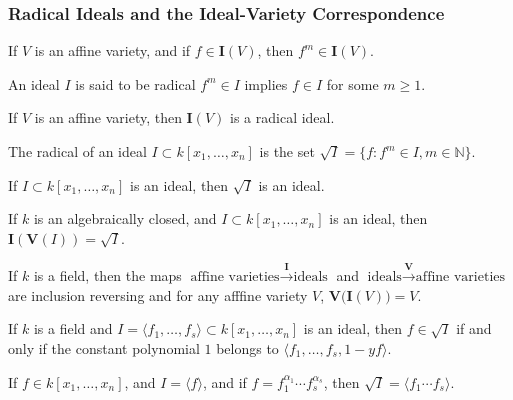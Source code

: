 \documentclass[crop=false,class=article,oneside]{standalone}
\begin{document}
    \subsubsection{Radical Ideals and the Ideal-Variety Correspondence}
    \begin{theorem}
    If $V$ is an affine variety, and if $f\in \textbf{I}(V)$, then $f^m\in \textbf{I}(V)$.
    \end{theorem}
    \begin{definition}
    An ideal $I$ is said to be radical $f^m \in I$ implies $f\in I$ for some $m\geq 1$.
    \end{definition}
    \begin{theorem}
    If $V$ is an affine variety, then $\textbf{I}(V)$ is a radical ideal.
    \end{theorem}
    \begin{definition}
    The radical of an ideal $I\subset k[x_{1},\hdots,x_{n}]$ is the set $\sqrt{I}=\{f:f^{m}\in I,m\in\mathbb{N}\}$.
    \end{definition}
    \begin{theorem}
    If $I\subset k[x_1,\hdots ,x_n]$ is an ideal, then $\sqrt{I}$ is an ideal.
    \end{theorem}
    \begin{theorem}
    If $k$ is an algebraically closed, and $I\subset k[x_1,\hdots ,x_n]$ is an ideal, then $\textbf{I}(\mathbf{V}(I))=\sqrt{I}$.
    \end{theorem}
    \begin{theorem}
    If $k$ is a field, then the maps $\textrm{affine varieties} \overset{\textbf{I}}\rightarrow \textrm{ideals}$ and $\textrm{ideals} \overset{\mathbf{V}}\rightarrow \textrm{affine varieties}$ are inclusion reversing and for any afffine variety $V$, $\mathbf{V}\big(\textbf{I}(V)\big) = V$.
    \end{theorem}
    \begin{theorem}
    If $k$ is a field and $I=\langle f_1,\hdots, f_s\rangle\subset k[x_1,\hdots ,x_n]$ is an ideal, then $f\in \sqrt{I}$ if and only if the constant polynomial $1$ belongs to $\langle f_1,\hdots, f_s, 1-yf\rangle$.
    \end{theorem}
    \begin{theorem}
    If $f\in k[x_1,\hdots ,x_n]$, and $I = \langle f\rangle$, and if $f = f_1^{\alpha_1}\cdots f_s^{\alpha_s}$, then $\sqrt{I} = \langle f_1\cdots f_s\rangle$.
    \end{theorem}
\end{document}
